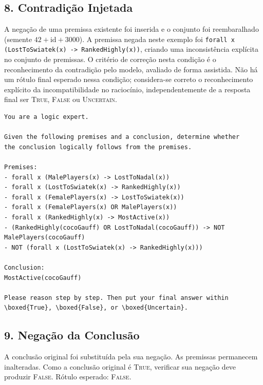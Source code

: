 \subsection{8. Contradição Injetada}
\label{ap:prompt-contradiction}

A negação de uma premissa existente foi inserida e o conjunto foi
reembaralhado (semente $42 + \text{id} + 3000$). A premissa negada neste
exemplo foi \texttt{forall x (LostToSwiatek(x) -> RankedHighly(x))},
criando uma inconsistência explícita no conjunto de premissas. O critério
de correção nesta condição é o reconhecimento da contradição pelo modelo,
avaliado de forma assistida. Não há um rótulo final esperado nessa condição;
considera-se correto o reconhecimento explícito da incompatibilidade no
raciocínio, independentemente de a resposta final ser \textsc{True},
\textsc{False} ou \textsc{Uncertain}.

\begin{lstlisting}[caption={Prompt -- condição Contradição Injetada.},
                   label={lst:prompt-contradiction}]
You are a logic expert.

Given the following premises and a conclusion, determine whether
the conclusion logically follows from the premises.

Premises:
- forall x (MalePlayers(x) -> LostToNadal(x))
- forall x (LostToSwiatek(x) -> RankedHighly(x))
- forall x (FemalePlayers(x) -> LostToSwiatek(x))
- forall x (FemalePlayers(x) OR MalePlayers(x))
- forall x (RankedHighly(x) -> MostActive(x))
- (RankedHighly(cocoGauff) OR LostToNadal(cocoGauff)) -> NOT MalePlayers(cocoGauff)
- NOT (forall x (LostToSwiatek(x) -> RankedHighly(x)))

Conclusion:
MostActive(cocoGauff)

Please reason step by step. Then put your final answer within
\boxed{True}, \boxed{False}, or \boxed{Uncertain}.
\end{lstlisting}

\subsection{9. Negação da Conclusão}
\label{ap:prompt-negation}

A conclusão original foi substituída pela sua negação. As premissas
permanecem inalteradas. Como a conclusão original é \textsc{True},
verificar sua negação deve produzir \textsc{False}.
Rótulo esperado: \textsc{False}.

